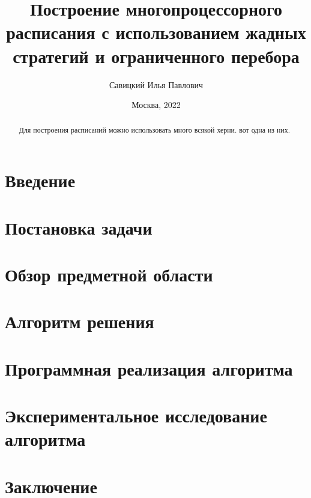 \documentclass[12pt]{article}
\author{Савицкий Илья Павлович}
\title{Построение многопроцессорного расписания с использованием жадных стратегий и ограниченного перебора}
\date{Москва, 2022}
\begin{document}

\newpage
\begin{abstract}
    Для построения расписаний можно использовать много всякой херни. вот одна из них.
\end{abstract}
\newpage
\tableofcontents
\newpage
\section{Введение}

\newpage
\section{Постановка задачи}

\newpage
\section{Обзор предметной области}


\newpage
\section{Алгоритм решения}


\newpage
\section{Программная реализация алгоритма}


\newpage
\section{Экспериментальное исследование алгоритма}


\newpage
\section{Заключение}


\newpage
\printbibliography
\end{document}
